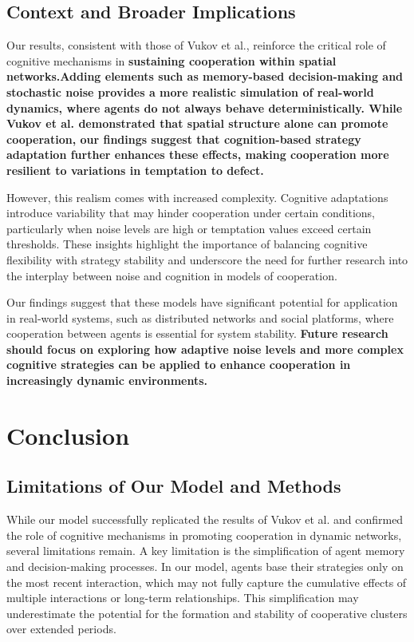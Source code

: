 \documentclass[runningheads]{llncs}
\begin{document}
\subsection{Context and Broader Implications}
Our results, consistent with those of Vukov et al., reinforce the critical role of cognitive mechanisms in \textbf{sustaining cooperation within spatial networks.Adding elements such as memory-based decision-making and stochastic noise provides a more realistic simulation of real-world dynamics, where agents do not always behave deterministically. While Vukov et al. demonstrated that spatial structure alone can promote cooperation, our findings suggest that cognition-based strategy adaptation further enhances these effects, making cooperation more resilient to variations in temptation to defect.}

However, this realism comes with increased complexity. Cognitive adaptations introduce variability that may hinder cooperation under certain conditions, particularly when noise levels are high or temptation values exceed certain thresholds. These insights highlight the importance of balancing cognitive flexibility with strategy stability and underscore the need for further research into the interplay between noise and cognition in models of cooperation.

Our findings suggest that these models have significant potential for application in real-world systems, such as distributed networks and social platforms, where cooperation between agents is essential for system stability. \textbf{Future research should focus on exploring how adaptive noise levels and more complex cognitive strategies can be applied to enhance cooperation in increasingly dynamic environments.}




\section{Conclusion}

\subsection{Limitations of Our Model and Methods}
While our model successfully replicated the results of Vukov et al. and confirmed the role of cognitive mechanisms in promoting cooperation in dynamic networks, several limitations remain. A key limitation is the simplification of agent memory and decision-making processes. In our model, agents base their strategies only on the most recent interaction, which may not fully capture the cumulative effects of multiple interactions or long-term relationships. This simplification may underestimate the potential for the formation and stability of cooperative clusters over extended periods.
\end{document}
